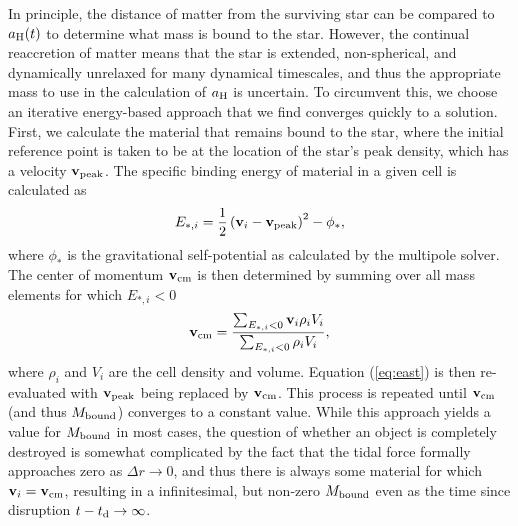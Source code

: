 \documentclass[twocolumn]{emulateapj}
\begin{document}
In principle, the distance of matter from the surviving star can be compared to $a_{\rm H} (t)$ to determine what mass is bound to the star. However, the continual reaccretion of matter means that the star is extended, non-spherical, and dynamically unrelaxed for many dynamical timescales, and thus the appropriate mass to use in the calculation of $a_{\rm H}$ is uncertain. To circumvent this, we choose an iterative energy-based approach that we find converges quickly to a solution. First, we calculate the material that remains bound to the star, where the initial reference point is taken to be at the location of the star's peak density, which has a velocity ${\bf v}_{\rm peak}$. The specific binding energy of material in a given cell is calculated as
\begin{equation}
E_{\ast,i} = \frac{1}{2}\left({\bf v}_{i} - {\bf v}_{\rm peak}\right)^{2} - \phi_{\ast}\label{eq:east},
\end{equation}
where $\phi_{\ast}$ is the gravitational self-potential as calculated by the multipole solver. The center of momentum ${\bf v}_{\rm cm}$ is then determined by summing over all mass elements for which $E_{\ast,i} < 0$
\begin{equation}
{\bf v}_{\rm cm} =\frac{ \sum_{E_{\ast,i} < 0} {\bf v}_{i} \rho_{i} V_{i}}{\sum_{E_{\ast,i} < 0} {\rho_{i} V_{i}}},
\end{equation}
where $\rho_{i}$ and $V_{i}$ are the cell density and volume. Equation (\ref{eq:east}) is then re-evaluated with ${\bf v}_{\rm peak}$ being replaced by ${\bf v}_{\rm cm}$. This process is repeated until ${\bf v}_{\rm cm}$ (and thus $M_{\rm bound}$) converges to a constant value. While this approach yields a value for $M_{\rm bound}$ in most cases, the question of whether an object is completely destroyed is somewhat complicated by the fact that the tidal force formally approaches zero as $\Delta r \rightarrow 0$, and thus there is always some material for which ${\bf v}_{i} = {\bf v}_{\rm cm}$, resulting in a infinitesimal, but non-zero $M_{\rm bound}$ even as the time since disruption $t - t_{\rm d} \rightarrow \infty$.
\end{document}

